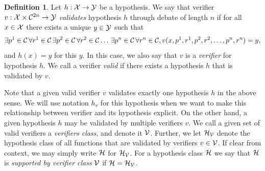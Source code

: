 \documentclass[11pt,letterpaper]{article}
\theoremstyle{definition}
\newtheorem{definition}[theorem]{Definition}
\theoremstyle{plain}
\begin{document}
\begin{definition}
Let $h:{\mathcal X}\to{\mathcal Y}$ be a hypothesis. We say that verifier $v: {\mathcal X}\times {{\mathcal C}}^{2n} \to {\mathcal Y}$ \emph{validates} hypothesis $h$ through debate of length $n$ if for all $x\in{\mathcal X}$ there exists a unique $y\in {\mathcal Y}$ such that
\begin{align*}
\exists{p}^1\in{{\mathcal C}}\,\forall{r}^1\in{{\mathcal C}}\,\exists{p}^2\in{{\mathcal C}}\,\forall {r}^2\in{{\mathcal C}}\ldots\,\exists{p}^n\in{{\mathcal C}}\,\forall{r}^n\in{{\mathcal C}},
v(x, {p}^1, {r}^1, {p}^2, {r}^2, \ldots,  {p}^n, {r}^n) = y,
\end{align*}
and $h(x) = y$ for this $y$. 
In this case, we also say that $v$ is a \emph{verifier} for hypothesis $h$. We call a verifier \emph{valid} if there exists a hypothesis $h$ that is validated by $v$.
\end{definition}

Note that a given valid verifier $v$ validates exactly one hypothesis $h$ in the above sense. We will use notation $h_v$ for this hypothesis when we want to make this relationship between verifier and its hypothesis explicit. On the other hand, a given hypothesis $h$ may be validated by multiple verifiers $v$.
We call a given set of valid verifiers a \emph{verifiers class}, and denote it ${\mathcal V}$. Further, we let ${{\mathcal H}}_{\mathcal V}$ denote the hypothesis class of all functions that are validated by verifiers $v\in{\mathcal V}$. If clear from context, we may simply write ${{\mathcal H}}$ for ${{\mathcal H}}_{\mathcal V}$.
For a hypothesis class ${{\mathcal H}}$ we say that ${{\mathcal H}}$ is \emph{supported by verifier class} ${\mathcal V}$ if ${{\mathcal H}} = {{\mathcal H}}_{\mathcal V}$.
\end{document}

